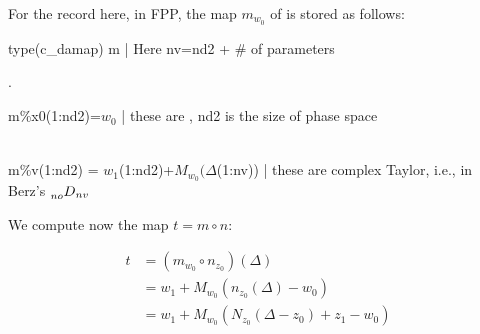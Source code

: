 \documentclass{hitec}     %
\begin{document}
{For the record here, in FPP, the map ${m}_{{w}_{0}}$ of  is stored as follows:

\vskip 0.2cm
{\color{blue}
\small
\hskip 1cm type(c_damap) m    | Here nv=nd2 + \# of parameters

\hskip 4cm  .

\hskip 1cm m\%x0(1:nd2)=$w_0$ \hskip 0.5cm | these are , nd2 is the size of phase space

\vskip -1.2cm
%
\begin{align} \label{eq:cdamap} \end{align}

\hskip 1cm m\%v(1:nd2) = $w_1$(1:nd2)+$M_{w_0}(\Delta$(1:nv))   \hskip 0.5cm | these are complex Taylor, i.e., in Berz's $\prescript{}{no}{D}_{nv} $

 }
\vskip 0.2cm

We  compute now the map $t=m\circ n$:


%
%

\begin{align}t&=\left({{m}_{{w}_{0}}\circ {n}_{{z}_{0}}}\right)\left({\Delta }\right)\nonumber \\
 &={w}_{1}+{M}_{{w}_{0}}({n}_{{z}_{0}}\left({\Delta }\right)-{w}_{0})\nonumber \\
 &={w}_{1}+{M}_{{w}_{0}}({N}_{{z}_{0}}(\Delta -{z}_{0})+{z}_{1}-{w}_{0})\ \label{eq:concattot}\end{align}

}
\end{document}
